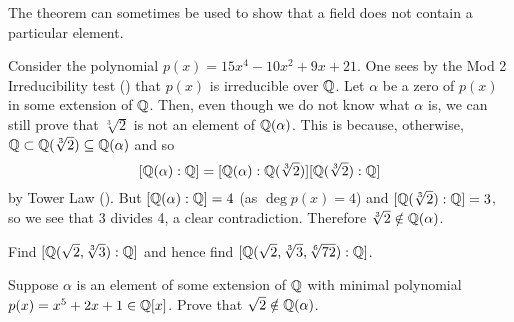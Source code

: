 The theorem can sometimes be used to show that a field does not contain a particular element.

\begin{example}
    Consider the polynomial $p(x) = 15x^4 - 10x^2 + 9x + 21$. One sees by the Mod 2 Irreducibility test () that $p(x)$ is irreducible over $\mathbb{Q}$. Let $\alpha$ be a zero of $p(x)$ in some extension of $\mathbb{Q}$. Then, even though we do not know what $\alpha$ is, we can still prove that $\sqrt[3]2$ is not an element of $\mathbb{Q}(\alpha)$. This is because, otherwise, $\mathbb{Q} \subset \mathbb{Q}(\sqrt[3]2) \subseteq \mathbb{Q}(\alpha)$ and so
    \[
        [\mathbb{Q}(\alpha):\mathbb{Q}] = [\mathbb{Q}(\alpha):\mathbb{Q}(\sqrt[3]2)][\mathbb{Q}(\sqrt[3]2):\mathbb{Q}]
    \]
    by Tower Law (). But $[\mathbb{Q}(\alpha):\mathbb{Q}] = 4$ (as $\deg p(x) = 4$) and $[\mathbb{Q}(\sqrt[3]2):\mathbb{Q}] = 3$, so we see that 3 divides 4, a clear contradiction. Therefore $\sqrt[3]2 \notin \mathbb{Q}(\alpha)$.
\end{example}

\begin{exercise}
    Find $[\mathbb{Q}(\sqrt2,\sqrt[3]3):\mathbb{Q}]$ and hence find $[\mathbb{Q}(\sqrt2, \sqrt[3]3, \sqrt[6]{72}):\mathbb{Q}]$.
\end{exercise}

\begin{exercise}
    Suppose $\alpha$ is an element of some extension of $\mathbb{Q}$ with minimal polynomial $p(x) = x^5 + 2x + 1 \in \mathbb{Q}[x]$. Prove that $\sqrt2 \notin \mathbb{Q}(\alpha)$.
\end{exercise}

